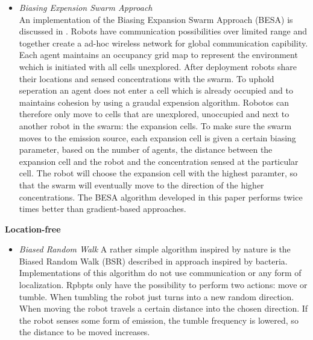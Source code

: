 \begin{itemize}
		\item
		\textit{Biasing Expension Swarm Approach}\\
		An implementation of the Biasing Expansion Swarm Approach (BESA) is discussed in \cite{cui2004swarm}.
		Robots have communication possibilities over limited range and together create a ad-hoc wireless network for global communication capibility.
		Each agent maintains an occupancy grid map to represent the environment wchich is initiated with all cells unexplored.
		After deployment robots share their locations and sensed concentrations with the swarm.
		To uphold seperation an agent does not enter a cell which is already occupied and to maintains cohesion by using a graudal expension algorithm.
		Robotos can therefore only move to cells that are unexplored, unoccupied and next to another robot in the swarm: the expansion cells.
		To make sure the swarm moves to the emission source, each expansion cell is given a certain biasing parameter, based on the number of agents, the distance between the expansion cell and the robot and the concentration sensed at the particular cell.
		The robot will choose the expansion cell with the highest paramter, so that the swarm will eventually move to the direction of the higher concentrations.
		The BESA algorithm developed in this paper performs twice times better than gradient-based approaches.

	\end{itemize}

	\textbf{Location-free}
	\begin{itemize}
		\item
		\textit{Biased Random Walk}
		A rather simple algorithm inspired by nature is the Biased Random Walk (BSR) described in \cite{dhariwal2004bacterium} approach inspired by bacteria. Implementations of this algorithm do not use communication or any form of localization. Rpbpts only have the possibility to perform two actions: move or tumble. When tumbling the robot just turns into a new random direction. When moving the robot travels a certain distance into the chosen direction. If the robot senses some form of emission, the tumble frequency is lowered, so the distance to be moved increases.
	\end{itemize}


